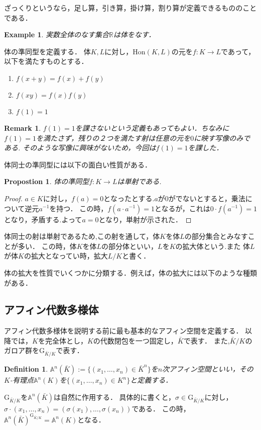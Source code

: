 \documentclass{ujarticle}
\newtheorem{dfn}[thm]{Definition}
\newtheorem{prop}[thm]{Propostion}
\newtheorem{epl}[thm]{Example}
\newtheorem*{rem}{Remark}
\begin{document}
ざっくりというなら，足し算，引き算，掛け算，割り算が定義できるもののことである．

\begin{epl}
 実数全体のなす集合$\mathbb{R}$は体をなす．
\end{epl}

体の準同型を定義する．
体$K,L$に対し，$\mathrm{Hon}(K,L)$の元を$f:K \to L$であって，以下を満たすものとする．
\begin{enumerate}
  \item $f(x + y)= f(x) + f(y)$
  \item $f(xy)=f(x)f(y)$
  \item $f(1)=1$
\end{enumerate}
\begin{rem}
 $f(1)=1$を課さないという定義もあってもよい．ちなみに$f(1)=1$を満たさず，残りの２つを満たす射は任意の元を$0$に映す写像のみである.
 そのような写像に興味がないため，今回は$f(1)=1$を課した．
\end{rem}
体同士の準同型には以下の面白い性質がある．
\begin{prop}
 体の準同型$f:K \to L$は単射である.
\end{prop}
\begin{proof}
  $a \in K$に対し，$f(a)=0$となったとする.$a$が$0$がでないとすると，乗法について逆元$a^{-1}$を持つ．
  この時，$f(a \cdot a^{-1})=1$となるが，これは$0 \cdot f(a^{-1})=1$となり，矛盾する.よって$a=0$となり，単射が示された．
\end{proof}
体同士の射は単射であるため,この射を通して，体$K$を体$L$の部分集合とみなすことが多い．
この時，体$K$を体$L$の部分体といい，$L$を$K$の拡大体という.また
体$L$が体$K$の拡大となってい時，拡大$L/K$と書く．

体の拡大を性質でいくつかに分類する．例えば，体の拡大には以下のような種類がある．




\subsection{アフィン代数多様体}
\label{subs:アフィン代数多様体}
アフィン代数多様体を説明する前に最も基本的なアフィン空間を定義する．
以降では，$K$を完全体とし，$K$の代数閉包を一つ固定し，$\bar{K}$で表す．
また,$\bar{K}/K$のガロア群を$\mathrm{G}_{ \bar{K}/K}$で表す．
\begin{dfn}
 $\mathbb{A}^n(\bar{K}):=\{ (x_1,\dots,x_n) \in \bar{K}^n \} $を$n$次アフィン空間といい，その$K$-有理点$\mathbb{A}^n(K)$を$\{ (x_1,\dots,x_n) \in K^n \}$と定義する．
\end{dfn}
$\mathrm{G}_{\bar{K}/K}$を$\mathbb{A}^n(\bar{K})$は自然に作用する．
具体的に書くと，$\sigma \in \mathrm{G}_{\bar{K}/K}$に対し， $ \sigma\cdot (x_1 , \dots , x_n) =(\sigma(x_1),\dots , \sigma(x_n))$である．
この時，$\mathbb{A}^n(\bar{K})^{\mathrm{G}_{\bar{K}/K}}= \mathbb{A}^n(K)$となる．
\end{document}

